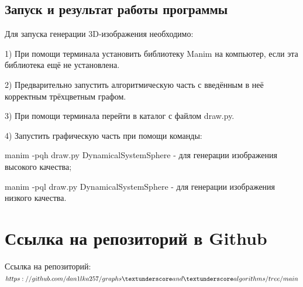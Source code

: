 	\subsection{Запуск и результат работы программы}
	\hspace{0.5 cm} Для запуска генерации 3D-изображения необходимо:
	\par 1) При помощи терминала установить библиотеку Manim на компьютер, если эта библиотека ещё не установлена.
	\par 2) Предварительно запустить алгоритмическую часть с введённым в неё корректным трёхцветным графом.
	\par 3) При помощи терминала перейти в каталог с файлом draw.py.
	\par 4) Запустить графическую часть при помощи команды:
	\par manim -pqh draw.py DynamicalSystemSphere - для генерации изображения высокого качества;
	\par manim -pql draw.py DynamicalSystemSphere - для генерации изображения низкого качества.
	\section{Ссылка на репозиторий в Github}
	Ссылка на репозиторий: $https://github.com/dan1lka257/graphs \textunderscore and \textunderscore algorithms/tree/main$
